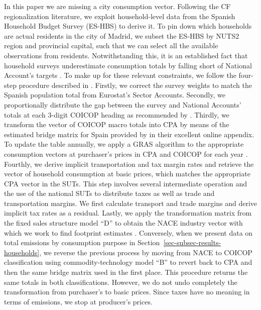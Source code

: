 \documentclass[
  10pt,
  twocolumn]{aft}
\begin{document}
In this paper we are missing a city consumption vector. Following the CF
regionalization literature, we exploit household-level data from the
Spanish Household Budget Survey (ES-HBS) to derive it. To pin down which
households are actual residents in the city of Madrid, we subset the
ES-HBS by NUTS2 region and provincial capital, such that we can select
all the available observations from residents. Notwithstanding this, it
is an established fact that household surveys underestimate consumption
totals by falling short of National Account's targets
\citep{coli_distributional_2022, ivanova_environmental_2016}. To make up
for these relevant constraints, we follow the four-step procedure
described in \citet{cazcarro_linking_2022}. Firstly, we correct the
survey weights to match the Spanish population total from Eurostat's
Sector Accounts. Secondly, we proportionally distribute the gap between
the survey and National Accounts' totals at each 3-digit COICOP heading
as recommended by \citet{coli_distributional_2022}. Thirdly, we
transform the vector of COICOP macro totals into CPA by means of the
estimated bridge matrix for Spain provided by
\citet{cazcarro_linking_2022} in their excellent online appendix. To
update the table annually, we apply a GRAS algorithm to the appropriate
consumption vectors at purchaser's prices in CPA and COICOP for each
year \citep{temurshoev_note_2013}. Fourthly, we derive implicit
transportation and tax margin rates and retrieve the vector of household
consumption at basic prices, which matches the appropriate CPA vector in
the SUTs. This step involves several intermediate operation and the use
of the national SUTs to distribute taxes as well as trade and
transportation margins. We first calculate transport and trade margins
and derive implicit tax rates as a residual. Lastly, we apply the
transformation matrix from the fixed sales structure model ``D'' to
obtain the NACE industry vector with which we work to find footprint
estimates \citep[ch.~4]{miller_input-output_2022}. Conversely, when we
present data on total emissions by consumption purpose in
Section~\ref{sec-subsec-results-households}, we reverse the previous
process by moving from NACE to COICOP classification using
commodity-technology model ``B'' to revert back to CPA
\citep[p.~203]{miller_input-output_2022} and then the same bridge matrix
used in the first place. This procedure returns the same totals in both
classifications. However, we do not undo completely the transformation
from purchaser's to basic prices. Since taxes have no meaning in terms
of emissions, we stop at producer's prices.
\end{document}
